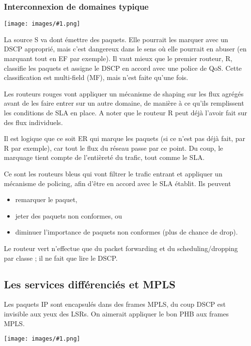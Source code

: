 \documentclass[10pt,a4paper]{report}
\newcommand{\dessin}[1]{\begin{center}\texttt{[image: images/\#1.png]}\end{center}}
\begin{document}
			\subsubsection{Interconnexion de domaines typique}
			
			\dessin{132}
			
			La source S va dont émettre des paquets. Elle pourrait les marquer avec un DSCP approprié, mais c'est dangereux dans le sens où elle pourrait en abuser (en marquant tout en EF par exemple). Il vaut mieux que le premier routeur, R, classifie les paquets et assigne le DSCP en accord avec une police de QoS. Cette classification est multi-field (MF), mais n'est faite qu'une fois.
			
			Les routeurs rouges vont appliquer un mécanisme de shaping sur les flux agrégés avant de les faire entrer sur un autre domaine, de manière à ce qu'ils remplissent les conditions de SLA en place. A noter que le routeur R peut déjà l'avoir fait sur des flux individuels.
			
			Il est logique que ce soit ER qui marque les paquets (si ce n'est pas déjà fait, par R par exemple), car tout le flux du réseau passe par ce point. Du coup, le marquage tient compte de l'entièreté du trafic, tout comme le SLA.
			
			Ce sont les routeurs bleus qui vont filtrer le trafic entrant et appliquer un mécanisme de policing, afin d'être en accord avec le SLA établit. Ils peuvent
			
			\begin{itemize}
				\item remarquer le paquet,
				\item jeter des paquets non conformes, ou
				\item diminuer l'importance de paquets non conformes (plus de chance de drop).
			\end{itemize}
			
			Le routeur vert n'effectue que du packet forwarding et du scheduling/dropping par classe ; il ne fait que lire le DSCP.
			
			\subsection{Les services différenciés et MPLS}
			
			Les paquets IP sont encapsulés dans des frames MPLS, du coup DSCP est invisible aux yeux des LSRs. On aimerait appliquer le bon PHB aux frames MPLS.
			
			\dessin{119}
			
\end{document}
